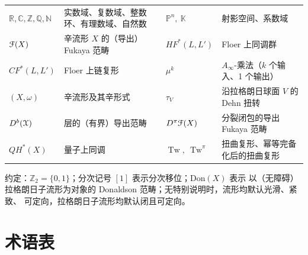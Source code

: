 \documentclass[11pt,a4paper]{article}
\numberwithin{equation}{section}
\newcommand{\bR}{\mathbb{R}}
\newcommand{\bZ}{\mathbb{Z}}
\newcommand{\bC}{\mathbb{C}}
\newcommand{\bQ}{\mathbb{Q}}
\newcommand{\bN}{\mathbb{N}}
\newcommand{\bP}{\mathbb{P}}
\newcommand{\bK}{\mathbb{K}}
\newcommand{\scrX}{\EuScript{X}}
\newcommand{\scrF}{\EuScript{F}}
\newcommand{\Tw}{\operatorname{Tw}}
\begin{document}
\begin{center}
\small
\begin{tabular}{@{}p{}p{}p{}p{}@{}}
\toprule
$\bR,\bC,\bZ,\bQ,\bN$ & 实数域、复数域、整数环、有理数域、自然数 & $\bP^n,\ \bK$ & 射影空间、系数域 \\
$\scrF(X)$ & 辛流形 $X$ 的（导出）Fukaya 范畴 & $HF^*(L,L')$ & Floer 上同调群 \\
$CF^*(L,L')$ & Floer 上链复形 & $\mu^k$ & $A_\infty$-乘法（$k$ 个输入、1 个输出） \\
$(X,\omega)$ & 辛流形及其辛形式 & $\tau_V$ & 沿拉格朗日球面 $V$ 的 Dehn 扭转 \\
$D^b(\scrX)$ & 层的（有界）导出范畴 & $D^{\pi}\scrF(X)$ & 分裂闭包的导出 Fukaya 范畴 \\
$QH^*(X)$ & 量子上同调 & $\Tw,\ \Tw^{\pi}$ & 扭曲复形、幂等完备化后的扭曲复形 \\
\bottomrule
\end{tabular}
\end{center}

\noindent 约定：$\bZ_2=\{0,1\}$；分次记号 $[1]$ 表示分次移位；$\mathrm{Don}(X)$ 表示
以（无障碍）拉格朗日子流形为对象的 Donaldson 范畴；无特别说明时，流形均默认光滑、紧致、
可定向，拉格朗日子流形均默认闭且可定向。

\clearpage

\section*{术语表}
\end{document}
